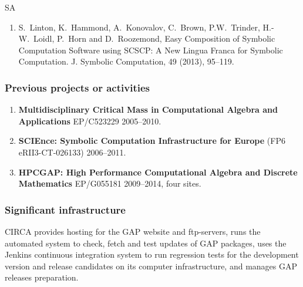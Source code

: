 \begin{sitedescription}{SA}
\begin{enumerate}
\item S.~Linton, K.~Hammond, A.~Konovalov, C.~Brown, P.W.~Trinder, H.-W.~Loidl, 
P.~Horn and D.~Roozemond, Easy Composition of Symbolic Computation Software using 
SCSCP: A New Lingua Franca for Symbolic Computation.
J. Symbolic Computation, 49 (2013), 95--119.
\end{enumerate}

\subsubsection*{Previous projects or activities}

\begin{enumerate}
\item
\textbf{Multidisciplinary Critical Mass in Computational
Algebra and Applications} EP/C523229 2005--2010.
\item 
\textbf{SCIEnce: Symbolic Computation Infrastructure for Europe}
(FP6 eRII3-CT-026133) 2006--2011.
\item
\textbf{HPCGAP: High Performance Computational Algebra and Discrete Mathematics} 
EP/G055181 2009--2014, four sites.
\end{enumerate}

\subsubsection*{Significant infrastructure}

CIRCA provides hosting for the GAP website and ftp-servers, runs the 
automated system to check, fetch and test updates of GAP packages, uses 
the Jenkins continuous integration system to run regression tests for the 
development version and release candidates on its computer infrastructure, 
and manages GAP releases preparation.
\end{sitedescription}

